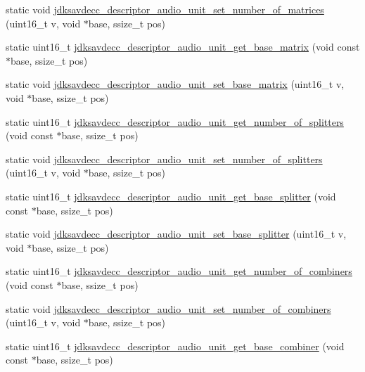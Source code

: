\begin{DoxyCompactItemize}
\item 
static void \hyperlink{group__descriptor__audio_gaf257c181e37bd0afb7727d43791cd3b3}{jdksavdecc\+\_\+descriptor\+\_\+audio\+\_\+unit\+\_\+set\+\_\+number\+\_\+of\+\_\+matrices} (uint16\+\_\+t v, void $\ast$base, ssize\+\_\+t pos)
\item 
static uint16\+\_\+t \hyperlink{group__descriptor__audio_gaaa0540f5e8e411442d5bc4c138db7435}{jdksavdecc\+\_\+descriptor\+\_\+audio\+\_\+unit\+\_\+get\+\_\+base\+\_\+matrix} (void const $\ast$base, ssize\+\_\+t pos)
\item 
static void \hyperlink{group__descriptor__audio_ga60f7aaff33ba1362ce55688a1be1abaf}{jdksavdecc\+\_\+descriptor\+\_\+audio\+\_\+unit\+\_\+set\+\_\+base\+\_\+matrix} (uint16\+\_\+t v, void $\ast$base, ssize\+\_\+t pos)
\item 
static uint16\+\_\+t \hyperlink{group__descriptor__audio_ga293d054cd8fa6d17da7c35550b65c79e}{jdksavdecc\+\_\+descriptor\+\_\+audio\+\_\+unit\+\_\+get\+\_\+number\+\_\+of\+\_\+splitters} (void const $\ast$base, ssize\+\_\+t pos)
\item 
static void \hyperlink{group__descriptor__audio_ga8b907db7fd0b69cfd799e0b88214cd70}{jdksavdecc\+\_\+descriptor\+\_\+audio\+\_\+unit\+\_\+set\+\_\+number\+\_\+of\+\_\+splitters} (uint16\+\_\+t v, void $\ast$base, ssize\+\_\+t pos)
\item 
static uint16\+\_\+t \hyperlink{group__descriptor__audio_ga4900735a921bd7016439df94304a5970}{jdksavdecc\+\_\+descriptor\+\_\+audio\+\_\+unit\+\_\+get\+\_\+base\+\_\+splitter} (void const $\ast$base, ssize\+\_\+t pos)
\item 
static void \hyperlink{group__descriptor__audio_ga76e946c323bfd0e672146d4fd49dd7f9}{jdksavdecc\+\_\+descriptor\+\_\+audio\+\_\+unit\+\_\+set\+\_\+base\+\_\+splitter} (uint16\+\_\+t v, void $\ast$base, ssize\+\_\+t pos)
\item 
static uint16\+\_\+t \hyperlink{group__descriptor__audio_ga44bb436e208816550d4a090958cd39b9}{jdksavdecc\+\_\+descriptor\+\_\+audio\+\_\+unit\+\_\+get\+\_\+number\+\_\+of\+\_\+combiners} (void const $\ast$base, ssize\+\_\+t pos)
\item 
static void \hyperlink{group__descriptor__audio_ga82603890c6e4a62f5c6b9b9fcd3a5fd5}{jdksavdecc\+\_\+descriptor\+\_\+audio\+\_\+unit\+\_\+set\+\_\+number\+\_\+of\+\_\+combiners} (uint16\+\_\+t v, void $\ast$base, ssize\+\_\+t pos)
\item 
static uint16\+\_\+t \hyperlink{group__descriptor__audio_ga88f5818dbcc20fcf7f64a84300e62006}{jdksavdecc\+\_\+descriptor\+\_\+audio\+\_\+unit\+\_\+get\+\_\+base\+\_\+combiner} (void const $\ast$base, ssize\+\_\+t pos)

\end{DoxyCompactItemize}
